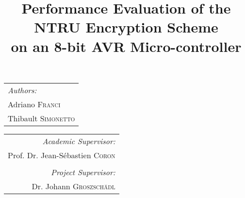 \documentclass[11pt,a4paper]{article}
\begin{document}
\title{Performance Evaluation of the NTRU Encryption Scheme\\ on an 8-bit AVR 
Micro-controller}
\maketitle

\begin{tabular}[t]{@{}l} 
	\textit{Authors:}\\
	Adriano \textsc{Franci}\\
	Thibault \textsc{Simonetto}\\
\end{tabular}
\hfill
\begin{tabular}[t]{r@{}}
	\textit{Academic Supervisor:}\\
	Prof. Dr. Jean-S\'ebastien \textsc{Coron}\\
	\vspace{1em}\\
	\textit{Project Supervisor:}\\
	Dr. Johann \textsc{Groszsch\"adl}\\
\end{tabular}














\end{document}
